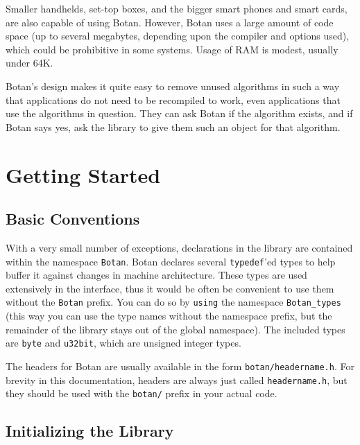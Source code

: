 \documentclass{article}
\newcommand{\filename}[1]{\texttt{#1}}
\newcommand{\keyword}[1]{\texttt{#1}}
\newcommand{\type}[1]{\texttt{#1}}
\newcommand{\namespace}[1]{\texttt{#1}}
\begin{document}
Smaller handhelds, set-top boxes, and the bigger smart phones and smart
cards, are also capable of using Botan. However, Botan uses a
large amount of code space (up to several megabytes, depending upon
the compiler and options used), which could be prohibitive in some
systems. Usage of RAM is modest, usually under 64K.

Botan's design makes it quite easy to remove unused algorithms in such
a way that applications do not need to be recompiled to work, even
applications that use the algorithms in question. They can ask Botan
if the algorithm exists, and if Botan says yes, ask the library to
give them such an object for that algorithm.

\section{Getting Started}

\subsection{Basic Conventions}

With a very small number of exceptions, declarations in the library
are contained within the namespace \namespace{Botan}. Botan declares
several \keyword{typedef}'ed types to help buffer it against changes
in machine architecture.  These types are used extensively in the
interface, thus it would be often be convenient to use them without
the \namespace{Botan} prefix. You can do so by \keyword{using} the
namespace \namespace{Botan\_types} (this way you can use the type
names without the namespace prefix, but the remainder of the library
stays out of the global namespace). The included types are \type{byte}
and \type{u32bit}, which are unsigned integer types.

The headers for Botan are usually available in the form
\filename{botan/headername.h}. For brevity in this documentation,
headers are always just called \filename{headername.h}, but they
should be used with the \filename{botan/} prefix in your actual code.

\subsection{Initializing the Library}
\end{document}
